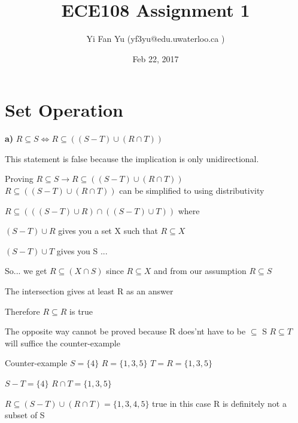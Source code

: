 \documentclass[12pts,A4]{article}
\begin{document}
\title{ECE108 Assignment 1}
\author{Yi Fan Yu (yf3yu@edu.uwaterloo.ca ) }
\date{Feb 22, 2017}
\maketitle


\section{Set Operation}




\begin{flushleft}
    
    \textbf{a)}
    $R \subseteq  S \iff R \subseteq  ((S - T) \cup (R \cap T))$ 

    This statement is false because the implication is only unidirectional. 
\bigskip


Proving $R \subseteq  S \rightarrow R \subseteq  ((S - T) \cup (R \cap T)) $ \\ 

$R \subseteq  ((S - T) \cup (R \cap T))$ can be simplified to using distributivity
\bigskip

$R \subseteq ( (( S - T )\cup R )\cap( ( S - T )\cup T) ) $ where

$( S - T )\cup R$ gives you a set X such that $R \subseteq X$

$ ( S - T )\cup T$  gives you S ...
\bigskip

	So... we get $ R \subseteq  (X \cap S) $ 
since $R \subseteq X$ and from our assumption $R \subseteq S$

The intersection gives at least R as an answer

Therefore
$R \subseteq  R$ is true 
 
\bigskip
The opposite way cannot be proved because R does'nt have to be  $\subseteq$ S
$R \subseteq  T$ will suffice the counter-example
\bigskip

Counter-example $ S = \{4\}$
$R = \{1,3,5\}$
$T = R = \{1,3,5\}$

$S-T = \{4\}$
$R \cap T = \{1,3,5\}$

$ R \subseteq (S - T) \cup (R \cap T) = \{1,3,4,5\}$ true
in this case R is definitely not a subset of S



\end{flushleft}

\pagebreak
\end{document}
